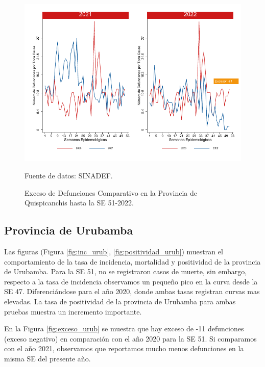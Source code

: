 \documentclass[12pt,a4paper,openany]{book}
\begin{document}
	\begin{figure}[h]
		\caption{Exceso de Defunciones Comparativo en la Provincia de Quispicanchis hasta la SE 51-2022.}\label{fig:exceso_quisp}
		\begin{center}
			\includegraphics[width=0.7\linewidth]{../figuras/exceso_12.pdf}
		\end{center}
		{\footnotesize {Fuente de datos: SINADEF.}}
	\end{figure}
	
	\clearpage
	
	\subsection*{Provincia de Urubamba}
	\noindent Las figuras (Figura \ref{fig:inc_urub}, \ref{fig:positividad_urub}) muestran el comportamiento de la tasa de incidencia, mortalidad y positividad de la provincia de Urubamba. Para la SE 51, no se registraron casos de muerte, sin embargo, respecto a la tasa de incidencia observamos un pequeño pico en la curva desde la SE 47. Diferenciándose para el año 2020, donde ambas tasas registran curvas mas elevadas. La tasa de positividad de la provincia de Urubamba para ambas pruebas muestra un incremento importante.
	
	En la Figura \ref{fig:exceso_urub} se muestra que hay exceso de -11 defunciones (exceso negativo) en comparación con el año 2020 para la SE 51. Si comparamos con el año 2021, observamos que reportamos mucho menos defunciones en la misma SE del presente año.
	
\end{document}
